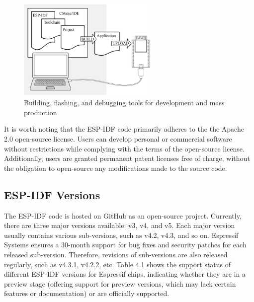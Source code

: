 \documentclass[a4paper,12pt,openany]{book}
\begin{document}
\begin{figure}[h!]
    \centering
    \includegraphics[width=0.6\textwidth]{D4Z/4-1}
    \caption{\Centering Building, flashing, and debugging tools for development and mass production}
    \label{Building, flashing, and debugging tools for development and mass production}
\end{figure}

It is worth noting that the ESP-IDF code primarily adheres to the the Apache 2.0 open-source license. Users can develop personal or commercial software without restrictions while complying with the terms of the open-source license. Additionally, users are granted permanent patent licenses free of charge, without the obligation to open-source any modifications made to the source code.

\subsection{ESP-IDF Versions}
The ESP-IDF code is hosted on GitHub as an open-source project. Currently, there are three major versions available: v3, v4, and v5. Each major version usually contains various sub-versions, such as v4.2, v4.3, and so on. Espressif Systems ensures a 30-month support for bug fixes and security patches for each released sub-version. Therefore, revisions of sub-versions are also released regularly, such as v4.3.1, v4.2.2, etc. Table 4.1 shows the support status of different ESP-IDF versions for Espressif chips, indicating whether they are in a preview stage (offering support for preview versions, which may lack certain features or documentation) or are officially supported.
\end{document}
